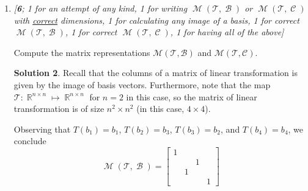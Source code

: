 \documentclass{amsart}
\theoremstyle{definition}
\theoremstyle{definition}
\newtheorem*{solution}{Solution}
\DeclareMathOperator{\R}{\mathbb{R}}
\DeclareMathOperator{\1}{\mathbbm{1}}
\DeclareMathOperator{\powerset}{\mathcal{P}}
\DeclareMathOperator{\MM}{\mathcal{M}}
\DeclareMathOperator{\B}{\mathcal{B}}
\DeclareMathOperator{\CC}{\mathcal{C}}
\newcommand{\Tau}{\mathcal{T}}
\begin{document}
\begin{enumerate}[itemsep = 2mm]
\begin{enumerate}[label=\arabic*.]
\begin{solution}
				For $\powerset_{\CC} \left(
				\begin{bmatrix}
				a&b\\
				c&d
				\end{bmatrix}\right)$, we observe that for a set of scalars (in $\R$) $\set{a_i}_{i=1}^{4}$, 
				\begin{align*}
				\sum_{i=1}^{4} a_i c_i = \begin{bmatrix}
				a_1 + a_2 + a_3 + a_4 & a_2 + a_3 + a_4  \\ a_3 + a_4 &  a_4 
				\end{bmatrix} = \begin{bmatrix}
				a&b\\
				c&d
				\end{bmatrix}
				\end{align*}
				gives the set of solution $a_1 = a-b$, $a_2 = b-c$, $a_3 = c-d$, $a_4 = d$. Hence,
				\begin{equation}
					\label{eqcoordinatisationC}
					\powerset_{\CC} \left(
					\begin{bmatrix}
					a&b\\
					c&d
					\end{bmatrix}\right) = \begin{bmatrix}
					a-b \\ b-c \\ c-d \\ d
					\end{bmatrix}
				\end{equation}
			\end{solution}
			
			
			\item \textit{[\textbf{6}; 1 for an attempt of any kind, 1 for writing $\MM(\Tau,\B)$ or $\MM(\Tau,\CC)$ with \uline{correct} dimensions, 1 for calculating any image of a basis, 1 for correct $\MM(\Tau,\B)$, 1 for correct $\MM(\Tau,\CC)$, 1 for having all of the above]}
			
			Compute the matrix representations $\mathcal{M}(\mathcal{T},\mathcal{B})$ and $\mathcal{M}(\mathcal{T},\mathcal{C})$. 
			
			\begin{solution}
				Recall that the columns of a matrix of linear transformation is given by the image of basis vectors. Furthermore, note that the map $\Tau : \R^{n \times n} \mapsto \R^{n \times n}$ for $n=2$ in this case, so the matrix of linear transformation is of size $n^2 \times n^2$ (in this case, $4 \times 4$).
				
				Observing that $T(b_1) = b_1$, $T(b_2) = b_3$, $T(b_3) = b_2$, and $T(b_4) = b_4$, we conclude
				\begin{equation}
					\label{eqmatrixB}
					\MM(\Tau,\B) = \begin{bmatrix}
					1 & & & \\ & & 1 & \\ & 1 & & \\ & & & 1
					\end{bmatrix}
				\end{equation}
				

\end{solution}
\end{enumerate}
\end{enumerate}
\end{document}
